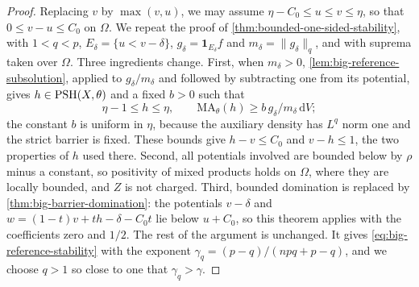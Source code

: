 \begin{proof}
Replacing $v$ by $\max(v,u)$, we may assume $\eta-C_0\leq u\leq v\leq\eta$, so that $0\leq v-u\leq C_0$ on $\Omega$. We repeat the proof of \cref{thm:bounded-one-sided-stability}, with $1<q<p$, $E_\delta=\{u<v-\delta\}$, $g_\delta=\mathbf1_{E_\delta}f$ and $m_\delta=\|g_\delta\|_q$, and with suprema taken over $\Omega$. Three ingredients change. First, when $m_\delta>0$, \cref{lem:big-reference-subsolution}, applied to $g_\delta/m_\delta$ and followed by subtracting one from its potential, gives $h\in\mathrm{PSH}(X,\theta)$ and a fixed $b>0$ such that
\[
 \eta-1\leq h\leq\eta,\qquad
 \mathrm{MA}_\theta(h)\geq b\,g_\delta/m_\delta\,\mathrm{d}V;
\]
the constant $b$ is uniform in $\eta$, because the auxiliary density has $L^q$ norm one and the strict barrier is fixed. These bounds give $h-v\leq C_0$ and $v-h\leq1$, the two properties of $h$ used there. Second, all potentials involved are bounded below by $\rho$ minus a constant, so positivity of mixed products holds on $\Omega$, where they are locally bounded, and $Z$ is not charged. Third, bounded domination is replaced by \cref{thm:big-barrier-domination}: the potentials $v-\delta$ and $w=(1-t)v+th-\delta-C_0t$ lie below $u+C_0$, so this theorem applies with the coefficients zero and $1/2$. The rest of the argument is unchanged. It gives \eqref{eq:big-reference-stability} with the exponent $\gamma_q=(p-q)/(npq+p-q)$, and we choose $q>1$ so close to one that $\gamma_q>\gamma$.
\end{proof}

